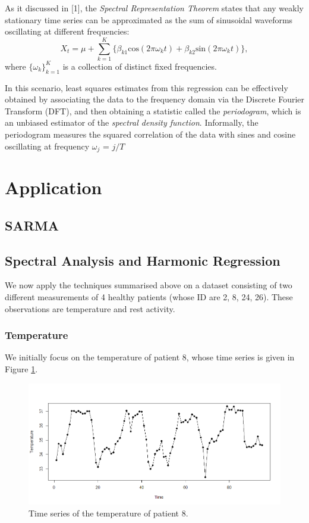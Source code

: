 \documentclass[]{article}
\begin{document}
As it discussed in [1], the \textit{Spectral Representation Theorem} states that any weakly stationary time series can be approximated as the
sum of sinusoidal waveforms oscillating at different frequencies:
\begin{equation}
X_{t} = \mu + \sum_{k = 1}^{K} \big\{ \beta_{k 1}\text{cos}(2\pi\omega_k t) + \beta_{k 2}\text{sin}(2\pi\omega_k t) \big\},
\end{equation}
where $\{\omega_k\}_{k = 1}^{K}$ is a collection of distinct fixed frequencies.
\vspace{0.1cm}

In this scenario, least squares estimates from this regression can be effectively obtained by associating the data to the frequency domain via the Discrete Fourier Transform (DFT), and then obtaining a statistic called the \textit{periodogram}, which is an unbiased estimator of the \textit{spectral density function}. Informally, the periodogram 
measures the squared correlation of the data with sines and cosine oscillating at frequency $\omega_j$ = $j/T$

\section{Application}
\subsection{SARMA}

\subsection{Spectral Analysis and Harmonic Regression}
We now apply the techniques summarised above on a dataset consisting of two different measurements of 4 healthy patients (whose ID are 2, 8, 24, 26). These observations are temperature and rest activity. 

\subsubsection*{Temperature}
We initially focus on the temperature of patient 8, whose time series is given in Figure \ref{fig:Temp8}.


\begin{figure}[ht]\centering
	\includegraphics[scale = 0.3]{Temp8.png}
	\caption{Time series of the temperature of patient 8.}
	\label{fig:Temp8}
\end{figure}
\end{document}
